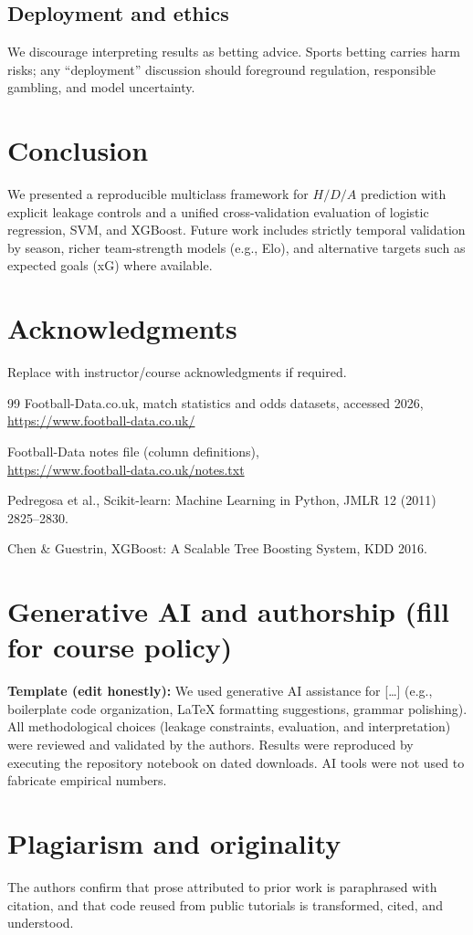 \documentclass[11pt,a4paper]{article}
\begin{document}
\subsection{Deployment and ethics}
We discourage interpreting results as betting advice. Sports betting carries harm risks; any ``deployment'' discussion should foreground regulation, responsible gambling, and model uncertainty.

\section{Conclusion}
We presented a reproducible multiclass framework for \(H/D/A\) prediction with explicit leakage controls and a unified cross-validation evaluation of logistic regression, SVM, and XGBoost. Future work includes strictly temporal validation by season, richer team-strength models (e.g., Elo), and alternative targets such as expected goals (xG) where available.

\section*{Acknowledgments}
Replace with instructor/course acknowledgments if required.

\begin{thebibliography}{99}
Football-Data.co.uk, match statistics and odds datasets, accessed 2026,\\
\url{https://www.football-data.co.uk/}

Football-Data notes file (column definitions),\\
\url{https://www.football-data.co.uk/notes.txt}

Pedregosa et al., Scikit-learn: Machine Learning in Python, JMLR 12 (2011) 2825--2830.

Chen \& Guestrin, XGBoost: A Scalable Tree Boosting System, KDD 2016.
\end{thebibliography}

\appendix
\section{Generative AI and authorship (fill for course policy)}
\textbf{Template (edit honestly):} We used generative AI assistance for [\ldots] (e.g., boilerplate code organization, LaTeX formatting suggestions, grammar polishing). All methodological choices (leakage constraints, evaluation, and interpretation) were reviewed and validated by the authors. Results were reproduced by executing the repository notebook on dated downloads. AI tools were not used to fabricate empirical numbers.

\section{Plagiarism and originality}
The authors confirm that prose attributed to prior work is paraphrased with citation, and that code reused from public tutorials is transformed, cited, and understood.
\end{document}
